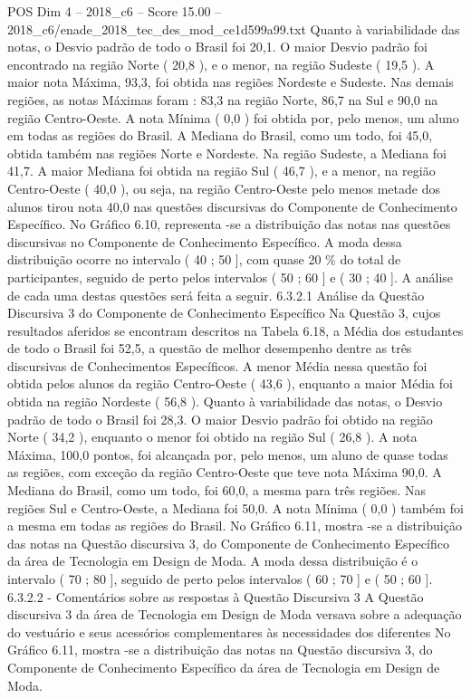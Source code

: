 \begin{textsample}{POS Dim 4 – 2018\_c6 – Score 15.00 – 2018\_c6/enade\_2018\_tec\_des\_mod\_ce1d599a99.txt}
Quanto à variabilidade das notas, o Desvio padrão de todo o Brasil foi 20,1.
O maior Desvio padrão foi encontrado na região Norte ( 20,8 ), e o menor, na região Sudeste ( 19,5 ).
A maior nota Máxima, 93,3, foi obtida nas regiões Nordeste e Sudeste.
Nas demais regiões, as notas Máximas foram : 83,3 na região Norte, 86,7 na Sul e 90,0 na região Centro-Oeste.
A nota Mínima ( 0,0 ) foi obtida por, pelo menos, um aluno em todas as regiões do Brasil.
A Mediana do Brasil, como um todo, foi 45,0, obtida também nas regiões Norte e Nordeste.
Na região Sudeste, a Mediana foi 41,7.
A maior Mediana foi obtida na região Sul ( 46,7 ), e a menor, na região Centro-Oeste ( 40,0 ), ou seja, na região Centro-Oeste pelo menos metade dos alunos tirou nota 40,0 nas questões discursivas do Componente de Conhecimento Específico.
No Gráfico 6.10, representa -se a distribuição das notas nas questões discursivas no Componente de Conhecimento Específico.
A moda dessa distribuição ocorre no intervalo ( 40 ; 50 ], com quase 20 \% do total de participantes, seguido de perto pelos intervalos ( 50 ; 60 ] e ( 30 ; 40 ].
A análise de cada uma destas questões será feita a seguir. 6.3.2.1 Análise da Questão Discursiva 3 do Componente de Conhecimento Específico Na Questão 3, cujos resultados aferidos se encontram descritos na Tabela 6.18, a Média dos estudantes de todo o Brasil foi 52,5, a questão de melhor desempenho dentre as três discursivas de Conhecimentos Específicos.
A menor Média nessa questão foi obtida pelos alunos da região Centro-Oeste ( 43,6 ), enquanto a maior Média foi obtida na região Nordeste ( 56,8 ).
Quanto à variabilidade das notas, o Desvio padrão de todo o Brasil foi 28,3.
O maior Desvio padrão foi obtido na região Norte ( 34,2 ), enquanto o menor foi obtido na região Sul ( 26,8 ).
A nota Máxima, 100,0 pontos, foi alcançada por, pelo menos, um aluno de quase todas as regiões, com exceção da região Centro-Oeste que teve nota Máxima 90,0.
A Mediana do Brasil, como um todo, foi 60,0, a mesma para três regiões.
Nas regiões Sul e Centro-Oeste, a Mediana foi 50,0.
A nota Mínima ( 0,0 ) também foi a mesma em todas as regiões do Brasil.
No Gráfico 6.11, mostra -se a distribuição das notas na Questão discursiva 3, do Componente de Conhecimento Específico da área de Tecnologia em Design de Moda.
A moda dessa distribuição é o intervalo ( 70 ; 80 ], seguido de perto pelos intervalos ( 60 ; 70 ] e ( 50 ; 60 ]. 6.3.2.2 - Comentários sobre as respostas à Questão Discursiva 3 A Questão discursiva 3 da área de Tecnologia em Design de Moda versava sobre a adequação do vestuário e seus acessórios complementares às necessidades dos diferentes No Gráfico 6.11, mostra -se a distribuição das notas na Questão discursiva 3, do Componente de Conhecimento Específico da área de Tecnologia em Design de Moda.

\end{textsample}
